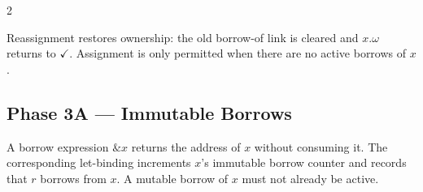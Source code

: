 \vspace{0.5em}
\begin{multicols}{2}

    \begin{prooftree}
    \end{prooftree}

    \columnbreak

    \begin{prooftree}
    \end{prooftree}

\end{multicols}

\vspace{0.5em}
Reassignment restores ownership: the old borrow-of link is cleared and
$x.\omega$ returns to $\checkmark$.
Assignment is only permitted when there are no active borrows of $x$.

\begin{prooftree}
\end{prooftree}

\subsection*{Phase 3A --- Immutable Borrows}

A borrow expression $\&x$ returns the address of $x$ without consuming it.
The corresponding let-binding increments $x$'s immutable borrow counter and
records that $r$ borrows from $x$.
A mutable borrow of $x$ must not already be active.

